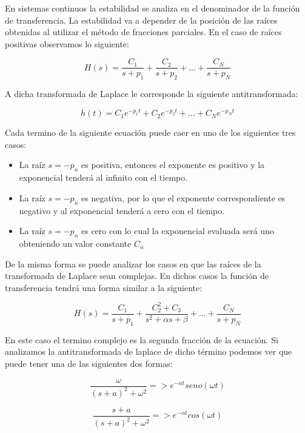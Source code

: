 En sistemas continuos la estabilidad se analiza en el denominador de la función de transferencia. La estabilidad va a depender de la posición de las raíces obtenidas al utilizar el método de fracciones parciales. En el caso de raíces positivas observamos lo siguiente:

\begin{equation}
H(s)=\frac{C_1}{s+p_1}+\frac{C_2}{s+p_2}+...+\frac{C_N}{s+p_N}
\end{equation}

A dicha transformada de Laplace le corresponde la siguiente antitransformada:

\begin{equation}
h(t)=C_1e^{-p_1t}+C_2e^{-p_2t}+...+C_Ne^{-p_Nt}
\end{equation}

Cada termino de la siguiente ecuación puede caer en uno de los siguientes tres casos:

\begin{itemize}
\item La raíz $s=-p_n$ es positiva, entonces el exponente es positivo y la exponencial tenderá al infinito con el tiempo.
\item La raíz $s=-p_n$ es negativa, por lo que el exponente correspondiente es negativo y al exponencial tenderá a cero con el tiempo.
\item La raíz $s=-p_n$ es cero con lo cual la exponencial evaluada será uno obteniendo un valor constante $C_n$
\end{itemize}

De la misma forma se puede analizar los casos en que las raíces de la transformada de Laplace sean complejas. En dichos casos la función de transferencia tendrá una forma similar a la siguiente:

\begin{equation}
H(s)=\frac{C_1}{s+p_1}+\frac{C_2^2+C_3}{s^2+\alpha s+\beta}+...+\frac{C_N}{s+p_N}
\end{equation}

En este caso el termino complejo es la segunda fracción de la ecuación. Si analizamos la antitransformada de laplace de dicho término podemos ver que puede tener una de las siguientes dos formas:

\begin{equation}
\frac{\omega}{(s+a)^2+{\omega}^2} => e^{-\alpha t}seno(\omega t)
\end{equation}

\begin{equation}
\frac{s+a}{(s+a)^2+{\omega}^2} => e^{-\alpha t}cos(\omega t)
\end{equation}

